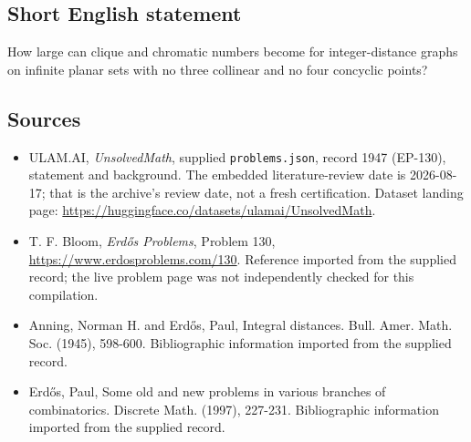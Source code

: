 \documentclass[11pt,a4paper]{article}
\begin{document}
\subsection{Short English statement}

How large can clique and chromatic numbers become for integer-distance graphs on infinite planar sets with no three collinear and no four concyclic points?

\subsection{Sources}

{\small

\begin{itemize}

\item[\hypertarget{source:1947:1}{S1}] ULAM.AI, \emph{UnsolvedMath}, supplied \texttt{problems.json}, record 1947 (EP-130), statement and background. The embedded literature-review date is 2026-08-17; that is the archive’s review date, not a fresh certification. Dataset landing page: \url{https://huggingface.co/datasets/ulamai/UnsolvedMath}.

\item[\hypertarget{source:1947:2}{S2}] T. F. Bloom, \emph{Erdős Problems}, Problem 130, \url{https://www.erdosproblems.com/130}. Reference imported from the supplied record; the live problem page was not independently checked for this compilation.

\item[\hypertarget{source:1947:3}{S3}] Anning, Norman H. and Erd\H{o}s, Paul, Integral distances. Bull. Amer. Math. Soc. (1945), 598-600. Bibliographic information imported from the supplied record.

\item[\hypertarget{source:1947:4}{S4}] Erd\H{o}s, Paul, Some old and new problems in various branches of combinatorics. Discrete Math. (1997), 227-231. Bibliographic information imported from the supplied record.

\end{itemize}

}

\label{end:1947}
\end{document}
